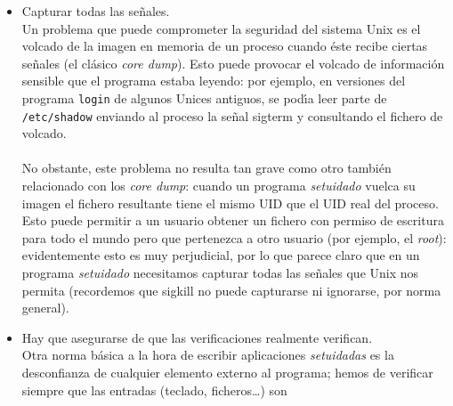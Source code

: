 \begin{itemize}
archivo es 0, los permisos son ignorados completamente y el acceso est\'a
permitido; de esta forma, el {\it root} puede sobreescribir archivos sin 
que le importen sus bits {\it rwx}, lo que implica que si uno de los procesos
que compiten por el recurso bloqueado est\'a setuidado a nombre del 
administrador, el esquema de bloqueo anterior se viene abajo.\\
\\Para poder bloquear recursos en un programa {\it setuidado} se utiliza la 
llamada
{\tt link()}, ya que si se intenta crear un enlace a un fichero que ya existe
{\tt link()} falla aunque el proceso que lo invoque sea propiedad del {\it 
root} (y aunque el fichero sobre el que se realice no le pertenezca).Tambi\'en 
es posible utilizar la llamada al sistema {\tt flock()} de algunos Unices, 
aunque es menos recomendable por motivos de portabilidad entre clones.
\item Capturar todas las se\~nales.\\ 
Un problema que puede comprometer la seguridad del sistema Unix es el volcado
de la imagen en memoria de un proceso cuando \'este recibe ciertas se\~nales
(el cl\'asico {\it core dump}). Esto puede provocar el volcado de informaci\'on
sensible que el programa estaba leyendo: por ejemplo, en versiones del programa 
{\tt login} de algunos Unices antiguos, se pod\'{\i}a leer parte de {\tt 
/etc/shadow} enviando al proceso la se\~nal {\sc sigterm} y consultando el 
fichero de volcado.\\
\\No obstante, este problema no resulta tan grave como otro tambi\'en 
relacionado con los {\it core dump}: cuando un programa {\it setuidado} vuelca
su imagen el fichero resultante tiene el mismo UID que el UID real del 
proceso. Esto puede permitir a un usuario obtener un fichero con permiso de
escritura para todo el mundo pero que pertenezca a otro usuario (por ejemplo,
el {\it root}): evidentemente esto es muy perjudicial, por lo que parece claro
que en un programa {\it setuidado} necesitamos capturar todas las se\~nales que 
Unix nos permita (recordemos que {\sc sigkill} no puede capturarse ni ignorarse,
por norma general).
\item Hay que asegurarse de que las verificaciones realmente verifican.\\
Otra norma b\'asica a la hora de escribir aplicaciones {\it setuidadas} es la
desconfianza de cualquier e\-le\-men\-to ex\-ter\-no al pro\-gra\-ma; hemos de 
ve\-ri\-fi\-car siem\-pre que las entradas (teclado, fi\-che\-ros\ldots) son 

\end{itemize}
